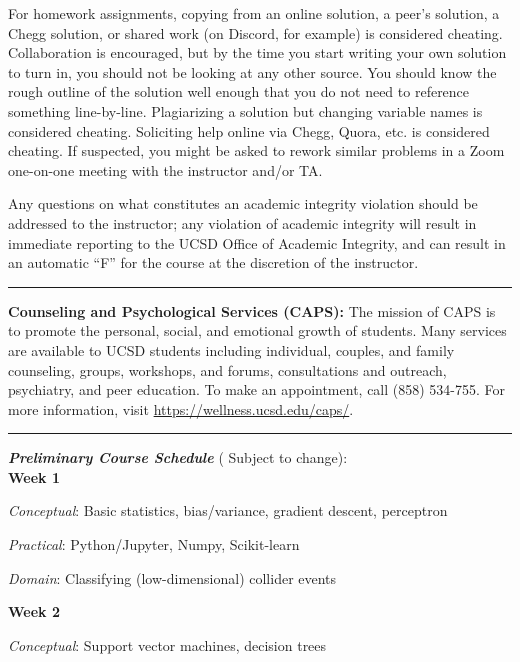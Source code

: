 \documentclass[12pt]{article}
\begin{document}
For homework assignments, copying from an online solution, a peer's solution, a Chegg solution, or shared work (on Discord, for example) is considered cheating.
Collaboration is encouraged, but by the time you start writing your own solution to turn in, you should not be looking at any other source.
You should know the rough outline of the solution well enough that you do not need to reference something line-by-line.
Plagiarizing a solution but changing variable names is considered cheating.
Soliciting help online via Chegg, Quora, etc. is considered cheating.
If suspected, you might be asked to rework similar problems in a Zoom one-on-one meeting with the instructor and/or TA.

Any questions on what constitutes an academic integrity violation should be addressed to the instructor; any violation of academic integrity will result in immediate reporting to the UCSD Office of Academic Integrity, and can result in an automatic ``F'' for the course at the discretion of the instructor.

\begin{center}
  \rule{\textwidth}{0.5pt}
\end{center}

\noindent\textbf{Counseling and Psychological Services (CAPS):} The mission of CAPS is to promote the personal, social, and emotional growth of students.
Many services are available to UCSD students including individual, couples, and family counseling, groups, workshops, and forums, consultations and outreach, psychiatry, and peer education.
To make an appointment, call (858) 534-755.
For more information, visit \href{https://wellness.ucsd.edu/caps/}{https://wellness.ucsd.edu/caps/}.

\begin{center}
  \rule{\textwidth}{0.5pt}
\end{center}

\noindent\textbf{\emph{Preliminary Course Schedule}} ({\color{Orange} Subject to change}):\\

\textbf{Week 1}

\emph{Conceptual}: Basic statistics, bias/variance, gradient descent, perceptron

\emph{Practical}: Python/Jupyter, Numpy, Scikit-learn

\emph{Domain}: Classifying (low-dimensional) collider events

\textbf{Week 2}

\emph{Conceptual}: Support vector machines, decision trees
\end{document}
